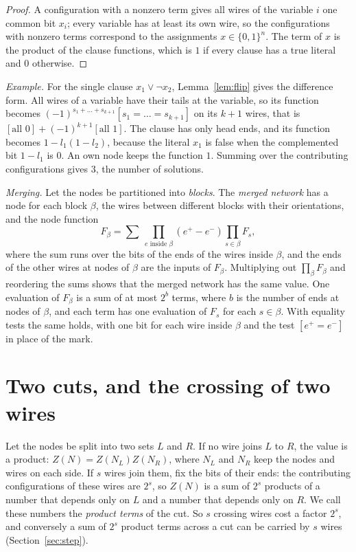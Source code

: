 \documentclass[11pt]{article}
\begin{document}
\begin{proof}
A configuration with a nonzero term gives all wires of the variable $i$ one common bit $x_i$; every variable has at least its own wire, so the configurations with nonzero terms correspond to the assignments $x\in\{0,1\}^n$. The term of $x$ is the product of the clause functions, which is $1$ if every clause has a true literal and $0$ otherwise.
\end{proof}

\emph{Example.} For the single clause $x_1\vee\neg x_2$, Lemma~\ref{lem:flip} gives the difference form. All wires of a variable have their tails at the variable, so its function becomes $(-1)^{s_1+\dots+s_{k+1}}[s_1=\dots=s_{k+1}]$ on its $k+1$ wires, that is $[\text{all }0]+(-1)^{k+1}[\text{all }1]$. The clause has only head ends, and its function becomes $1-l_1(1-l_2)$, because the literal $x_1$ is false when the complemented bit $1-l_1$ is $0$. An own node keeps the function $1$. Summing over the contributing configurations gives $3$, the number of solutions.

\emph{Merging.} Let the nodes be partitioned into \emph{blocks}. The \emph{merged network} has a node for each block $\beta$, the wires between different blocks with their orientations, and the node function
\begin{equation}\label{merge}
F_\beta=\sum\ \prod_{e\text{ inside }\beta}(e^+-e^-)\prod_{s\in\beta}F_s,
\end{equation}
where the sum runs over the bits of the ends of the wires inside $\beta$, and the ends of the other wires at nodes of $\beta$ are the inputs of $F_\beta$. Multiplying out $\prod_\beta F_\beta$ and reordering the sums shows that the merged network has the same value. One evaluation of $F_\beta$ is a sum of at most $2^{b}$ terms, where $b$ is the number of ends at nodes of $\beta$, and each term has one evaluation of $F_s$ for each $s\in\beta$. With equality tests the same holds, with one bit for each wire inside $\beta$ and the test $[e^+=e^-]$ in place of the mark.

\section{Two cuts, and the crossing of two wires}\label{sec:cross}

Let the nodes be split into two sets $L$ and $R$. If no wire joins $L$ to $R$, the value is a product: $Z(N)=Z(N_L)Z(N_R)$, where $N_L$ and $N_R$ keep the nodes and wires on each side. If $s$ wires join them, fix the bits of their ends: the contributing configurations of these wires are $2^s$, so $Z(N)$ is a sum of $2^s$ products of a number that depends only on $L$ and a number that depends only on $R$. We call these numbers the \emph{product terms} of the cut. So $s$ crossing wires cost a factor $2^s$, and conversely a sum of $2^s$ product terms across a cut can be carried by $s$ wires (Section~\ref{sec:step}).
\end{document}
